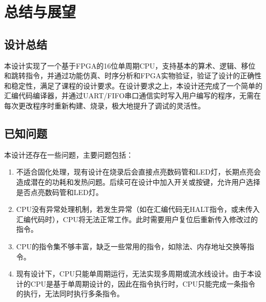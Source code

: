 \documentclass[lang=cn,a4paper,newtx]{elegantpaper}
\begin{document}
\section{总结与展望}
\subsection{设计总结}
本设计实现了一个基于FPGA的16位单周期CPU，支持基本的算术、逻辑、移位和跳转指令，并通过功能仿真、时序分析和FPGA实物验证，验证了设计的正确性和稳定性，满足了课程的设计要求。在设计要求之上，本设计还完成了一个简单的汇编代码编译器，并通过UART/FIFO串口通信实时写入用户编写的程序，无需在每次更改程序时重新构建、烧录，极大地提升了调试的灵活性。
\subsection{已知问题}
本设计还存在一些问题，主要问题包括：
\begin{enumerate}
  \item 不适合固化处理，现有设计在烧录后会直接点亮数码管和LED灯，长期点亮会造成潜在的功耗和发热问题。后续可在设计中加入开关或按键，允许用户选择是否点亮数码管和LED灯。
  \item CPU没有异常处理机制，若发生异常（如在汇编代码无HALT指令，或未传入汇编代码时），CPU将无法正常工作。此时需要用户复位后重新传入修改过的指令。
  \item CPU的指令集不够丰富，缺乏一些常用的指令，如除法、内存地址交换等指令。
  \item 现有设计下，CPU只能单周期运行，无法实现多周期或流水线设计。由于本设计的CPU是基于单周期设计的，因此在指令执行时，CPU只能完成一条指令的执行，无法同时执行多条指令。
\end{enumerate}
\nocite{FPGA-CPU}
\newpage
\printbibliography
\newpage
\addappheadtotoc
\end{document}
